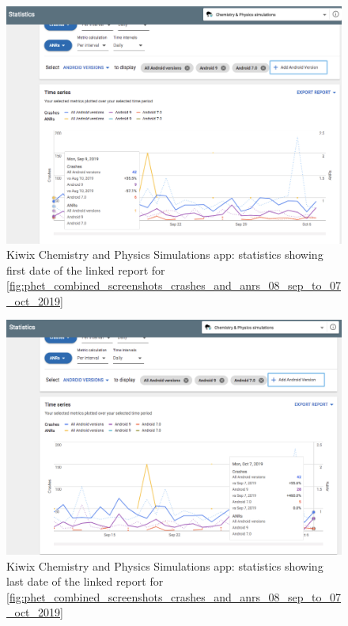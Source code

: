 \begin{figure}
    \centering
    \includegraphics{images/android-vitals-screenshots/kiwix/phet_statistics_mon_09_sep_2019.jpg}
    \caption{Kiwix Chemistry and Physics Simulations app: statistics showing first date of the linked report for \ref{fig:phet_combined_screenshots_crashes_and_anrs_08_sep_to_07_oct_2019}}
    \label{fig:phet_statistics_mon_09_sep_2019}
\end{figure}

\begin{figure}
    \centering
    \includegraphics{images/android-vitals-screenshots/kiwix/phet_statistics_mon_07_oct_2019.jpg}
    \caption{Kiwix Chemistry and Physics Simulations app: statistics showing last date of the linked report for \ref{fig:phet_combined_screenshots_crashes_and_anrs_08_sep_to_07_oct_2019}}
    \label{fig:phet_statistics_mon_07_oct_2019}
\end{figure}



